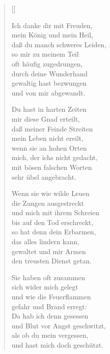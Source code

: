 \begin{multicols}{2}
\settowidth{\versewidth}{Ich danke dir mit Freuden,}
\begin{verse}[\versewidth]

 Ich danke dir mit Freuden,\\
mein König und mein Heil,\\
daß du manch schweres Leiden,\\
so mir zu meinem Teil\\
oft häufig zugedrungen,\\
durch deine Wunderhand\\
gewaltig hast bezwungen\\
und von mir abgewandt.

 Du hast in harten Zeiten\\
mir diese Gnad erteilt,\\
daß meiner Feinde Streiten\\
mein Leben nicht ereilt,\\
wenn sie an hohen Orten\\
mich, der ichs nicht gedacht,\\
mit bösen falschen Worten\\
sehr übel angebracht.

 Wenn sie wie wilde Leuen\\
die Zungen ausgestreckt\\
und mich mit ihrem Schreien\\
bis auf den Tod erschreckt,\\
so hat denn dein Erbarmen,\\
das alles lindern kann,\\
gewaltet und mir Armen\\
den treusten Dienst getan.

 Sie haben oft zusammen\\
sich wider mich gelegt\\
und wie die Feuerflammen\\
gefahr und Brand erregt:\\
Da hab ich denn gesessen\\
und Blut vor Angst geschwitzt,\\
als ob du mein vergessen,\\
und hast mich doch geschützt.


\end{verse}
\end{multicols}
